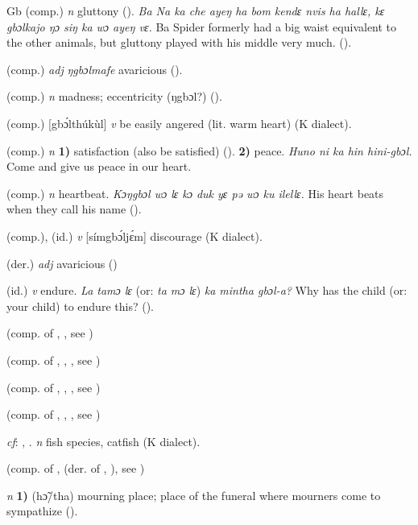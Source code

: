 \begin{letter}{Gb}
 (comp.) \textit{n} gluttony (\citealt{Sumner1921}). \textit{Ba Na ka che ayeŋ ha bom kendɛ nvis ha hallɛ, kɛ gbɔlkajo ŋɔ siŋ ka wɔ ayeŋ vɛ.} Ba Spider formerly had a big waist equivalent to the other animals, but gluttony played with his middle very much. (\citealt{Sumner1921}). 

 (comp.) \textit{adj} \textit{ŋgbɔlmafe} avaricious (\citealt{Pichl1967}). 

 (comp.) \textit{n} madness; eccentricity (ŋgbɔl?) (\citealt{Pichl1967}). 

 (comp.) [gbɔ́lthúkùl] \textit{v} be easily angered (lit. warm heart) (K dialect). 

 (comp.) \textit{n} \textbf{1)} satisfaction (also be satisfied) (\citealt{Pichl1967}). \textbf{2)} peace. \textit{Huno ni ka hin hini-gbɔl.} Come and give us peace in our heart.

 (comp.) \textit{n} heartbeat. \textit{Kɔŋgbɔl wɔ lɛ kɔ duk yɛ pə wɔ ku ilellɛ.} His heart beats when they call his name (\citealt{Pichl1967}). 

 (comp.), (id.) \textit{v} [símgbɔ́ljɛ́m] discourage (K dialect).

 (der.) \textit{adj} avaricious (\citealt{Pichl1967}) 

 (id.) \textit{v} endure. \textit{La tamɔ lɛ }(or: \textit{ta mɔ lɛ}) \textit{ka mintha gbɔl-a?} Why has the child (or: your child) to endure this? (\citealt{Pichl1967}). 

 (comp. of , , see ) 

 (comp. of , , , see ) 

 (comp. of , , , see ) 

 (comp. of , , , see ) 

 \textit{cf}: , . \textit{n} fish species, catfish (K dialect). 

 (comp. of ,  (der. of , ), see ) 

 \textit{n} \textbf{1)} (hɔ̃/tha) mourning place; place of the funeral where mourners come to sympathize (\citealt{Pichl1967}).


\end{letter}
